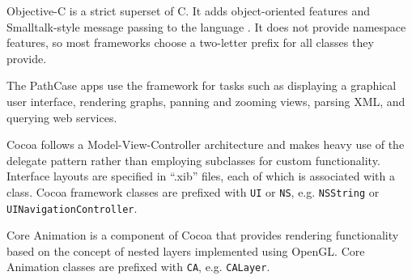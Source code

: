 Objective-C is a strict superset of C. It adds object-oriented features and
Smalltalk-style message passing to the language \cite{???}. It does not provide
namespace features, so most frameworks choose a two-letter prefix for all
classes they provide.

The PathCase apps use the framework for tasks such as displaying a graphical
user interface, rendering graphs, panning and zooming views, parsing XML, and
querying web services.

Cocoa follows a Model-View-Controller architecture and makes heavy use of the
delegate pattern rather than employing subclasses for custom functionality.
Interface layouts are specified in ``.xib'' files, each of which is associated
with a class. \cite{ios:application-programming-guide} Cocoa framework classes
are prefixed with \texttt{UI} or \texttt{NS}, e.g. \texttt{NSString} or
\texttt{UINavigationController}.

Core Animation is a component of Cocoa that provides rendering functionality
based on the concept of nested layers implemented using OpenGL.
\cite{ios:core-animation} Core Animation classes are prefixed with \texttt{CA},
e.g. \texttt{CALayer}.
